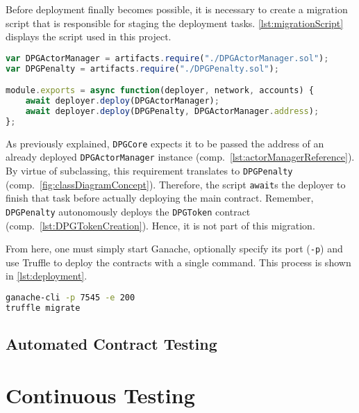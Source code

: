 Before deployment finally becomes possible, it is necessary to create a migration script that is responsible for staging the deployment tasks. \autoref{lst:migrationScript} displays the script used in this project.

\begin{lstlisting}[language=JavaScript, caption=Truffle migration script, label=lst:migrationScript]
var DPGActorManager = artifacts.require("./DPGActorManager.sol");
var DPGPenalty = artifacts.require("./DPGPenalty.sol");

module.exports = async function(deployer, network, accounts) {
	await deployer.deploy(DPGActorManager);
	await deployer.deploy(DPGPenalty, DPGActorManager.address);
};
\end{lstlisting}

As previously explained, \texttt{DPGCore} expects it to be passed the address of an already deployed \texttt{DPGActorManager} instance (comp.~\autoref{lst:actorManagerReference}). By virtue of subclassing, this requirement translates to \texttt{DPGPenalty} (comp.~\autoref{fig:classDiagramConcept}). Therefore, the script \texttt{await}s the deployer to finish that task before actually deploying the main contract. Remember, \texttt{DPGPenalty} autonomously deploys the \texttt{DPGToken} contract (comp.~\ref{lst:DPGTokenCreation}). Hence, it is not part of this migration.

From here, one must simply start Ganache, optionally specify its port (\texttt{-p}) and use Truffle to deploy the contracts with a single command. This process is shown in \autoref{lst:deployment}.

\begin{lstlisting}[language=bash, caption=Deploying to Ganache, label=lst:deployment]
ganache-cli -p 7545 -e 200
truffle migrate
\end{lstlisting}

\subsection{Automated Contract Testing}

\section{Continuous Testing}



